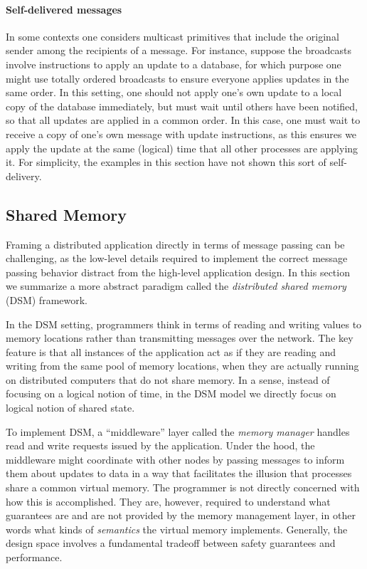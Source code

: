 \documentclass[]             %
{NASA}                       %
\theoremstyle{definition}
\begin{document}
\paragraph{Self-delivered messages}
In some contexts one considers multicast primitives that include the
original sender among the recipients of a message. For instance,
suppose the broadcasts involve instructions to apply an update to a
database, for which purpose one might use totally ordered broadcasts
to ensure everyone applies updates in the same order. In this setting,
one should not apply one's own update to a local copy of the database
immediately, but must wait until others have been notified, so that
all updates are applied in a common order. In this case, one must wait
to receive a copy of one's own message with update instructions, as
this ensures we apply the update at the same (logical) time that all
other processes are applying it. For simplicity, the examples in this
section have not shown this sort of self-delivery.

\subsection{Shared Memory}
\label{ssec:shared-memory}
Framing a distributed application directly in terms of message passing
can be challenging, as the low-level details required to implement the
correct message passing behavior distract from the high-level
application design. In this section we summarize a more abstract
paradigm called the \emph{distributed shared memory} (DSM) framework.

In the DSM setting, programmers think in terms of reading and writing
values to memory locations rather than transmitting messages over the
network. The key feature is that all instances of the application act
as if they are reading and writing from the same pool of memory
locations, when they are actually running on distributed computers
that do not share memory. In a sense, instead of focusing on a logical
notion of time, in the DSM model we directly focus on logical notion
of shared state.

To implement DSM, a ``middleware'' layer called the
\emph{memory manager} handles read and write requests issued by the
application. Under the hood, the middleware might coordinate with
other nodes by passing messages to inform them about updates to data
in a way that facilitates the illusion that processes share a common
virtual memory. The programmer is not directly concerned with how this
is accomplished. They are, however, required to understand what
guarantees are and are not provided by the memory management layer, in
other words what kinds of \emph{semantics} the virtual memory
implements. Generally, the design space involves a fundamental
tradeoff between safety guarantees and performance.
\end{document}
